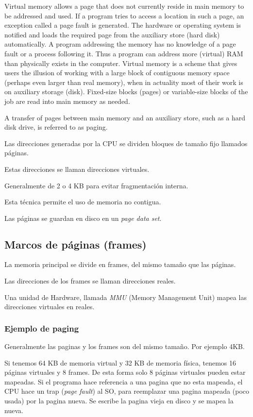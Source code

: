 \documentclass[a4paper, twoside]{article}
\begin{document}
Virtual memory allows a page that does not currently reside in main memory to be addressed and used. If a program tries to access a location in such a page, an exception called a page fault is generated. The hardware or operating system is notified and loads the required page from the auxiliary store (hard disk) automatically. A program addressing the memory has no knowledge of a page fault or a process following it. Thus a program can address more (virtual) RAM than physically exists in the computer. Virtual memory is a scheme that gives users the illusion of working with a large block of contiguous memory space (perhaps even larger than real memory), when in actuality most of their work is on auxiliary storage (disk). Fixed-size blocks (pages) or variable-size blocks of the job are read into main memory as needed.

A transfer of pages between main memory and an auxiliary store, such as a hard disk drive, is referred to as paging.

Las direcciones generadas por la CPU se dividen bloques de tamaño fijo llamados páginas.

Estas direcciones se llaman direcciones virtuales.

Generalmente de 2 o 4 KB para evitar fragmentación interna.

Esta técnica permite el uso de memoria no contigua.

Las páginas se guardan en disco en un \emph{page data set}.

\subsection{Marcos de páginas (frames)}
La memoria principal se divide en frames, del mismo tamaño que las páginas.

Las direcciones de los frames se llaman direcciones reales.

Una unidad de Hardware, llamada \emph{MMU} (Memory Management Unit) mapea las direcciones virtuales en reales.

\subsubsection{Ejemplo de paging}
Generalmente las paginas y los frames son del mismo tamaño. Por ejemplo 4KB.

Si tenemos 64 KB de memoria virtual y 32 KB de memoria física, tenemos 16 páginas virtuales y 8 frames. De esta forma solo 8 páginas virtuales pueden estar mapeadas. Si el programa hace referencia a una pagina que no esta mapeada, el CPU hace un trap (\emph{page fault}) al SO, para reemplazar una pagina mapeada (poco usada) por la pagina nueva. Se escribe la pagina vieja en disco y se mapea la nueva.
\end{document}
